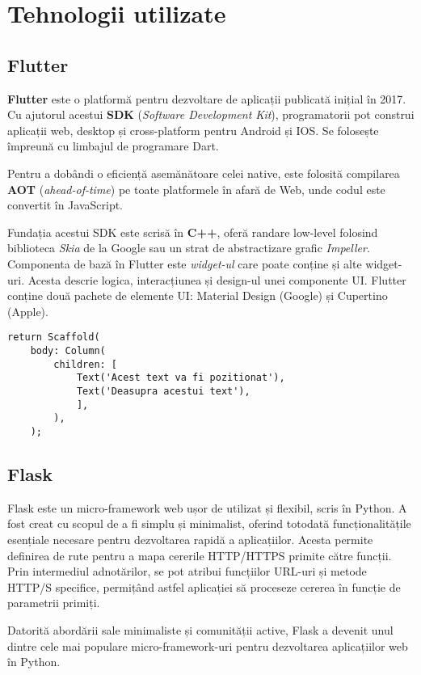 \chapter{Tehnologii utilizate}

\section{Flutter}

\textbf{Flutter} este o platformă pentru dezvoltare de aplicații publicată inițial în 2017. Cu ajutorul acestui \textbf{SDK} (\emph{Software Development Kit}), programatorii pot construi aplicații web, desktop și cross-platform pentru Android și IOS. Se folosește împreună cu limbajul de programare Dart.

Pentru a dobândi o eficiență asemănătoare celei native, este folosită compilarea \textbf{AOT} (\emph{ahead-of-time}) pe toate platformele în afară de Web, unde codul este convertit în JavaScript.

Fundația acestui SDK este scrisă în \textbf{C++}, oferă randare low-level folosind biblioteca \emph{Skia} de la Google sau un strat de abstractizare grafic \emph{Impeller}. Componenta de bază în Flutter este \emph{widget-ul} care poate conține și alte widget-uri. Acesta descrie logica, interacțiunea și design-ul unei componente UI. Flutter conține două pachete de elemente UI: Material Design (Google) și Cupertino (Apple).
\begin{lstlisting}[style=python, caption=Widget Scaffold]
return Scaffold(
	body: Column(
		children: [
			Text('Acest text va fi pozitionat'),
			Text('Deasupra acestui text'),
			],
		),
	);
\end{lstlisting}

\section{Flask}

Flask este un micro-framework web ușor de utilizat și flexibil, scris în Python. A fost creat cu scopul de a fi simplu și minimalist, oferind totodată funcționalitățile esențiale necesare pentru dezvoltarea rapidă a aplicațiilor. Acesta permite definirea de rute pentru a mapa cererile HTTP/HTTPS primite către funcții. Prin intermediul adnotărilor, se pot atribui funcțiilor URL-uri și metode HTTP/S specifice, permițând astfel aplicației să proceseze cererea în funcție de parametrii primiți.

Datorită abordării sale minimaliste și comunității active, Flask a devenit unul dintre cele mai populare micro-framework-uri pentru dezvoltarea aplicațiilor web în Python.

